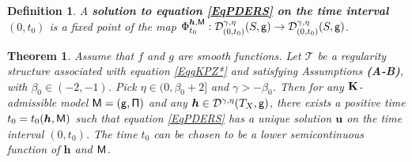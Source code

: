 \documentclass[10pt, reqno]{amsart}
\numberwithin{subsection}{section}
\numberwithin{subsubsection}{subsection}
\numberwithin{equation}{section} %
\theoremstyle{mystyle}
\newtheorem{thm}{Theorem}
\theoremstyle{mystyle2}
\newtheorem*{defn*} {Definition}
\theoremstyle{mystyle3}
\newcommand{\bsh}{\boldsymbol{h}}
\newcommand{\bsu}{\boldsymbol{u}}
\newcommand{\mcD}{\mathcal{D}}
\begin{document}
\medskip

\begin{defn*}
A \textbf{\textsf{solution to equation \eqref{EqPDERS} on the time interval $(0,t_0)$}} is a fixed point of the map $\Phi_{t_0}^{\bsh,{\sf M}} : \mcD^{\gamma,\eta}_{(0,t_0)}(S,{\sf g})\rightarrow\mcD^{\gamma,\eta}_{(0,t_0)}(S,{\sf g})$.
\end{defn*}

\medskip

\begin{thm} \label{ThmWellPosedness}
Assume that $f$ and $g$ are smooth functions. Let $\mathscr{T}$ be a regularity structure associated with equation \eqref{EqgKPZ*} and satisfying Assumptions \textbf{\textsf{(A-B)}}, with $\beta_0\in(-2,-1)$. Pick $\eta\in(0,\beta_0+2]$ and $\gamma>-\beta_0$. Then for any $\bf K$-admissible model $\sf M=(g,\Pi)$ and any $\bsh\in\mcD^{\gamma,\eta}(T_X,{\sf g})$, there exists a positive time $t_0=t_0(\bsh,{\sf M})$ such that equation \eqref{EqPDERS} has a unique solution $\bsu$ on the time interval $(0,t_0)$. The time $t_0$ can be chosen to be a lower semicontinuous function of $\bsh$ and $\sf M$.
\end{thm}

\medskip
\end{document}
